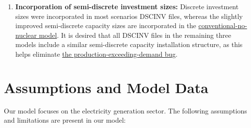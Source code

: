 \documentclass[14pt,a4paper]{article} %
\begin{document}
\begin{itemize}
\begin{enumerate}
\begin{enumerate}
\item \textbf{Incorporation of semi-discrete investment sizes:} Discrete investment sizes were incorporated in most scenarios \gls{DSCINV} files\cite{gargiulo_documentation_2005}, whereas the slightly improved semi-discrete capacity sizes are incorporated in the \href{https://github.com/arfc/i2cner/tree/master/JPN-Main-Model/active/co2-constrnt-conv-nonuc}{conventional-no-nuclear model}. It is desired that all \gls{DSCINV} files in the remaining three models include a similar semi-discrete capacity installation structure, as this helps eliminate \href{https://github.com/arfc/i2cner/issues/74}{the production-exceeding-demand bug}.\\

\end{enumerate}


\end{enumerate}


\end{itemize}

\section{Assumptions and Model Data}

	Our model focuses on the electricity generation sector. The following assumptions and limitations are present in our model:
	
\end{document}
